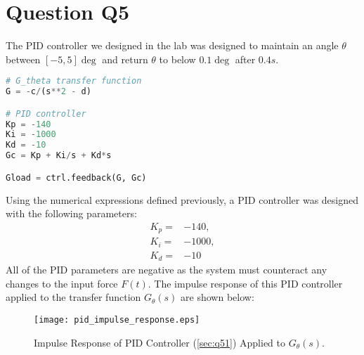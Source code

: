 \documentclass[a4paper,10pt,reqno]{amsart}
\numberwithin{equation}{section}
\begin{document}
\section{Question Q5}
The PID controller we designed in the lab was designed to maintain an angle $\theta$ between $[-5, 5]\deg$ and return $\theta$ to below $0.1\deg$ after $0.4s$.
\begin{lstlisting}[language=python]
# G_theta transfer function
G = -c/(s**2 - d)

# PID controller
Kp = -140
Ki = -1000
Kd = -10
Gc = Kp + Ki/s + Kd*s

Gload = ctrl.feedback(G, Gc)
\end{lstlisting}
Using the numerical expressions defined previously, a PID controller was designed with the following parameters:
\begin{subequations}
\label{sec:q51}
\begin{align}
    K_p =& -140, \\
    K_i =& -1000, \\
    K_d =& -10
\end{align}    
\end{subequations}
All of the PID parameters are negative as the system must counteract any changes to the input force $F(t)$. The impulse response of this PID controller applied to the transfer function $G_\theta(s)$ are shown below:
\begin{figure}[h]
\centering
\texttt{[image: pid\_impulse\_response.eps]}
\caption{Impulse Response of PID Controller (\ref{sec:q51}) Applied to $G_\theta(s)$.}
\end{figure}
\end{document}
